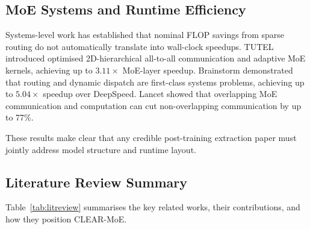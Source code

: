 \documentclass[conference]{IEEEtran}
\begin{document}
\subsection{MoE Systems and Runtime Efficiency}

Systems-level work has established that nominal FLOP savings from sparse routing do not automatically translate into wall-clock speedups. TUTEL \cite{hwang2023tutel} introduced optimised 2D-hierarchical all-to-all communication and adaptive MoE kernels, achieving up to $3.11\times$ MoE-layer speedup. Brainstorm \cite{brainstorm2023} demonstrated that routing and dynamic dispatch are first-class systems problems, achieving up to $5.04\times$ speedup over DeepSpeed. Lancet \cite{lancet2024} showed that overlapping MoE communication and computation can cut non-overlapping communication by up to 77\%.

These results make clear that any credible post-training extraction paper must jointly address model structure and runtime layout.

\subsection{Literature Review Summary}

Table~\ref{tab:litreview} summarises the key related works, their contributions, and how they position CLEAR-MoE.
\end{document}
